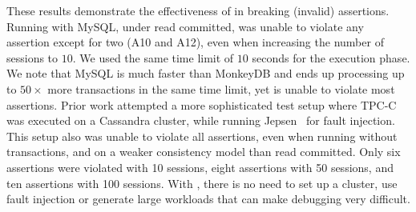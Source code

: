 


These results demonstrate the effectiveness of \tool{} in breaking (invalid) 
assertions. Running with MySQL, under read committed, was unable to violate any assertion except for
two (A10 and A12), even when increasing the number of sessions to $10$. We used
the same time limit of $10$ seconds for the execution phase. We note that MySQL
is much faster than MonkeyDB and ends up processing up to $50\times$ more
transactions in the same time limit, yet is unable to violate most assertions. 
Prior work \cite{DBLP:journals/pacmpl/RahmaniNDJ19} attempted a more sophisticated test
setup where TPC-C was executed on a Cassandra cluster, while running 
Jepsen~\cite{jepsen} for fault injection. This setup also was unable to violate 
all assertions, even when running without transactions, and on a weaker consistency model than read committed. 
Only six assertions were violated with 10 sessions, 
eight assertions with 50 sessions, and ten assertions with 100 sessions.
With \tool{}, there is no need to set up a cluster, use fault injection or
generate large workloads that can make debugging very difficult. 


